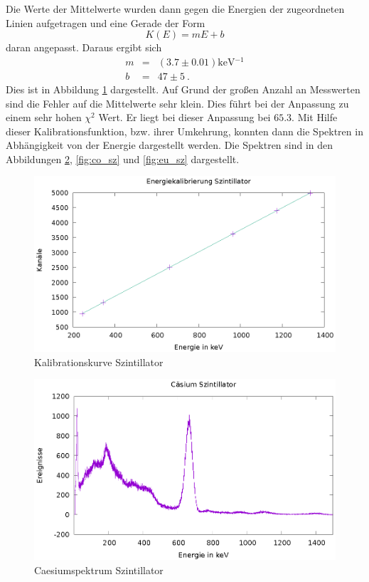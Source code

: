 \documentclass[12pt,a4paper,titlepage]{article}
\begin{document}
Die Werte der Mittelwerte wurden dann gegen die Energien der zugeordneten Linien aufgetragen und eine Gerade der Form
\begin{equation}
K(E) = mE + b
\end{equation}
daran angepasst. Daraus ergibt sich
\begin{eqnarray}
m &=& \left(\num{3.7}\pm\num{0.01}\right)\si{\kilo\electronvolt^{-1}}\\
b &=& \num{47}\pm\num{5}\ .
\end{eqnarray}
Dies ist in Abbildung \ref{fig:sz_kalib} dargestellt. Auf Grund der großen Anzahl an Messwerten sind die Fehler auf die Mittelwerte sehr klein. Dies führt bei der Anpassung zu einem sehr hohen $\chi^2$ Wert. Er liegt bei dieser Anpassung bei $\num{65.3}$. Mit Hilfe dieser Kalibrationsfunktion, bzw. ihrer Umkehrung, konnten dann die Spektren in Abhängigkeit von der Energie dargestellt werden. Die Spektren sind in den Abbildungen \ref{fig:cs_sz}, \ref{fig:co_sz} und \ref{fig:eu_sz} dargestellt.
\begin{figure}
	\centering
	\includegraphics{kalib_sz}
	\caption{Kalibrationskurve Szintillator}
	\label{fig:sz_kalib}
\end{figure}
\begin{figure}
	\centering
	\includegraphics{caesium_sz_energie}
	\caption{Caesiumspektrum Szintillator}
	\label{fig:cs_sz}
\end{figure}
\end{document}
